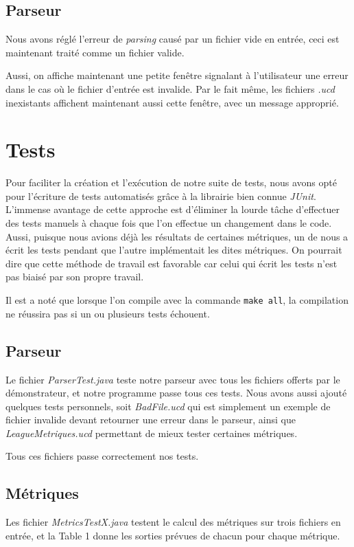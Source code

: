 \documentclass[letter,french]{report}
\begin{document}
	\subsection*{Parseur}
  Nous avons réglé l'erreur de \emph{parsing} causé par un fichier vide en
  entrée, ceci est maintenant traité comme un fichier valide.

  Aussi, on affiche
  maintenant une petite fenêtre signalant à l'utilisateur une erreur dans
  le cas où le fichier d'entrée est invalide. Par le fait même, les fichiers
  \emph{.ucd} inexistants affichent maintenant aussi cette fenêtre, avec un message
  approprié.
	

	\section*{Tests}
  Pour faciliter la création et l'exécution de notre suite de tests, nous avons opté pour
  l'écriture de tests automatisés grâce à la librairie bien connue \emph{JUnit}.
  L'immense avantage de cette approche est d'éliminer la lourde tâche
  d'effectuer des tests manuels à chaque fois que l'on effectue un changement
  dans le code. Aussi, puisque nous avions déjà les résultats de certaines
  métriques, un de nous a écrit les tests pendant que l'autre implémentait les
  dites métriques. On pourrait dire que cette méthode de travail est favorable
  car celui qui écrit les tests n'est pas biaisé par son propre travail.

  Il est a noté que lorsque l'on compile avec la commande \texttt{make all}, la
  compilation ne réussira pas si un ou plusieurs tests échouent. 

  \subsection*{Parseur}
  Le fichier \emph{ParserTest.java} teste notre parseur avec tous les fichiers
  offerts par le démonstrateur, et notre programme passe tous ces tests. Nous
  avons aussi ajouté quelques tests personnels, soit \emph{BadFile.ucd} qui est
  simplement un exemple de fichier invalide devant retourner une erreur dans le
  parseur, ainsi que \emph{LeagueMetriques.ucd} permettant de mieux tester
  certaines métriques.

  Tous ces fichiers passe correctement nos tests.

  \subsection*{Métriques}
  Les fichier \emph{MetricsTestX.java} testent le calcul des métriques sur trois
  fichiers en entrée, et la Table 1 donne les sorties prévues de chacun pour
  chaque métrique.
 
\end{document}
